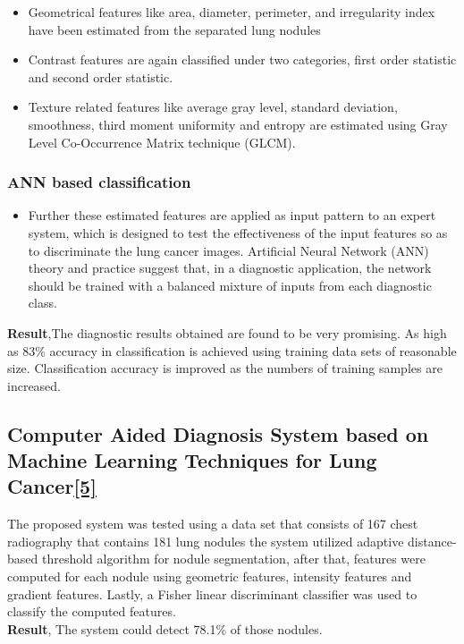 \documentclass[hidelinks,12pt]{article}
\begin{document}
\begin{itemize}
\item Geometrical features like area, diameter, perimeter, and
irregularity index have been estimated from the separated
lung nodules
\item Contrast features are again classified under two categories, first order statistic and second order statistic.
\item Texture related features like average gray level, standard
deviation, smoothness, third moment uniformity and
entropy are estimated using Gray Level Co-Occurrence
Matrix technique (GLCM).
\end{itemize}
\subsubsection{ANN based classification }
\begin{itemize}
\item Further these estimated features are applied as input
pattern to an expert system, which is designed to test the
effectiveness of the input features so as to discriminate the
lung cancer images. Artificial Neural Network (ANN)
theory and practice suggest that, in a diagnostic application,
the network should be trained with a balanced mixture of
inputs from each diagnostic class.
\end{itemize}
\textbf{Result},The diagnostic results obtained are found to be very
promising. As high as 83\% accuracy in classification is
achieved using training data sets of reasonable size.
Classification accuracy is improved as the numbers of training samples are increased.

\newpage

\subsection{Computer Aided Diagnosis System based on Machine Learning Techniques for Lung Cancer\hyperref[5]{[5]}}

The proposed system was tested using a data set that consists of 167 chest radiography that contains 181 lung nodules the system utilized adaptive distance-based threshold algorithm for nodule segmentation, after that, features were computed for each nodule using geometric features, intensity features and gradient features. Lastly, a Fisher linear discriminant classifier was used to classify the computed features.\\
\textbf{Result},
The system could detect 78.1\% of those nodules.
\end{document}
